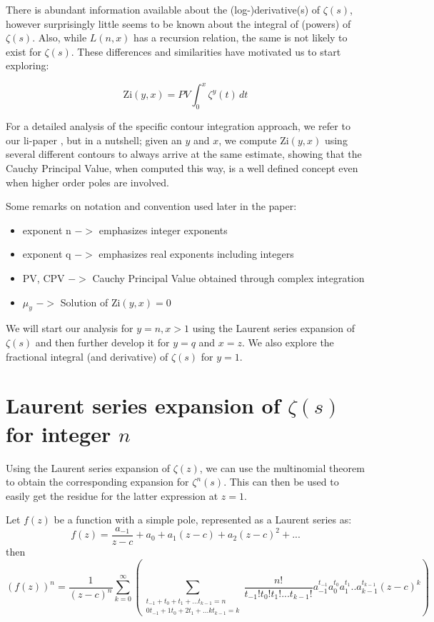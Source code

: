 \documentclass[a4paper,11pt,twoside]{amsart}
\newcommand\li{\mathrm{li}}
\newcommand\Zi{\mathrm{Zi}}
\begin{document}
There is abundant information available about the (log-)derivative(s) of $\zeta(s)$, however surprisingly little seems to be known about the integral of (powers) of $\zeta(s)$. Also, while $L(n,x)$ has a recursion relation, the same is not likely to exist for $\zeta(s)$. These differences and similarities have motivated us to start exploring:

\begin{equation}\label{zi1}
 \Zi(y,x) = PV \int_0^x {\zeta^{y}(t)} \,dt
\end{equation}


For a detailed analysis of the specific contour integration approach, we refer to our $\li$-paper \cite{mudw}, but in a nutshell; given an $y$ and $x$, we compute $\Zi(y,x)$ using several different contours to always arrive at the same estimate, showing that the Cauchy Principal Value, when computed this way, is a well defined concept even when higher order poles are involved. 
  
Some remarks on notation and convention used later in the paper:
\begin{itemize}
 \item exponent n $->$ emphasizes integer exponents
 \item exponent q $->$ emphasizes real exponents including integers
 \item PV, CPV $->$ Cauchy Principal Value obtained through complex integration 
 \item $\mu_y$ $->$ Solution of $\Zi(y,x)=0$
\end{itemize}

We will start our analysis for $y = n, x > 1$ using the Laurent series expansion of $\zeta(s)$ and then further develop it for $y = q$ and $x = z$. We also explore the fractional integral (and derivative) of $\zeta(s)$ for $y=1$.

\section{Laurent series expansion of $\zeta(s)$ for integer $n$}

Using the Laurent series expansion of $\zeta(z)$, we can use the multinomial theorem to obtain the corresponding expansion for $\zeta^{n}(s)$. This can then be used to easily get the residue for the latter expression at $z=1$.

Let $f(z)$ be a function with a simple pole, represented as a Laurent series as: $$f(z) = \frac{a_{-1}}{z-c} + a_0 + a_1 (z-c) + a_2 (z-c)^2 + ...$$
then $$(f(z))^n = \frac{1}{(z-c)^n} \sum\limits_{k=0}^{\infty}\left(\sum\limits_{\substack{t_{-1} + t_0 + t_1 + ... t_{k-1} = n \\ 0t_{-1} + 1t_0 + 2t_1 + ... kt_{k-1} = k}} \frac{n!}{t_{-1}!t_{0}!t_{1}!...t_{k-1}!} a_{-1}^{t_{-1}} a_{0}^{t_0}a_{1}^{t_1}..a_{k-1}^{t_{k-1}} (z-c)^k\right)$$
\end{document}
